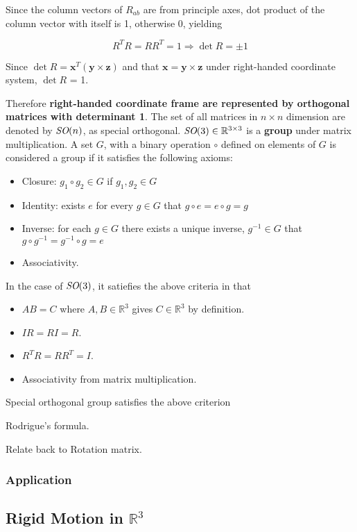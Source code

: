 \documentclass[letterpaper]{article}
\begin{document}
Since the column vectors of $R_{ab}$ are from principle axes, dot product of the column vector with
itself is 1, otherwise 0, yielding

$$R^TR = RR^T = 1 \Rightarrow \det R = \pm 1$$

Since $\det R = \mathbf{x}^T(\mathbf{y} \times \mathbf{z})$ and that $\mathbf{x} = \mathbf{y} \times \mathbf{z}$ under
right-handed coordinate system, $\det R$ = 1. 

Therefore \textbf{right-handed coordinate frame are represented by orthogonal matrices with determinant 1}. 
The set of all matrices in $n \times n$ dimension are denoted by $\emph{SO}(n)$, as special orthogonal.
$\emph{SO}(3) \in \mathbb{R}^{3\times 3}$ is a \textbf{group} under matrix multiplication. A set $G$, with a binary
operation $\circ$ defined on elements of $G$ is considered a group if it satisfies the following axioms:
\begin{itemize}
  \item Closure: $g_1 \circ g_2 \in G$ if $g_1, g_2 \in G$
  \item Identity: exists $e$ for every $g \in G$ that $g\circ e = e\circ g = g$
  \item Inverse: for each $g \in G$ there exists a unique inverse, $g^{-1} \in G$ that $g \circ g^{-1} = g^{-1} \circ g = e$
  \item Associativity. 
\end{itemize}

In the case of $\emph{SO}(3)$, it satiefies the above criteria in that
\begin{itemize}
  \item $AB=C$ where $A, B \in \mathbb{R}^3$ gives $C\in \mathbb{R}^3$ by definition.
  \item $IR = RI = R$.
  \item $R^TR = RR^T = I$.
  \item Associativity from matrix multiplication.
\end{itemize}

Special orthogonal group satisfies the above criterion 

Rodrigue's formula.

Relate back to Rotation matrix. 

\subsubsection{Application}

\subsection{Rigid Motion in $\mathbb{R}^3$}
\end{document}
